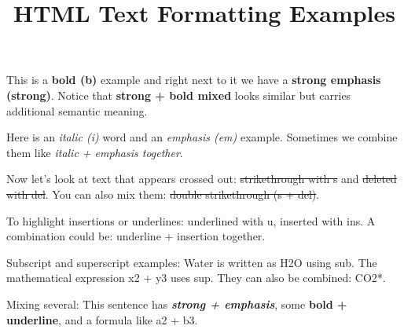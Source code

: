 \documentclass[11pt,a4paper]{article}
\title{HTML Text Formatting Examples}
\begin{document}
\maketitle

This is a \textbf{bold (b)} example and right next to it we have a \textbf{strong emphasis (strong)}. Notice that \textbf{strong + bold mixed} looks similar but carries additional semantic meaning.

Here is an \textit{italic (i)} word and an \textit{emphasis (em)} example. Sometimes we combine them like \textit{italic + emphasis together}.

Now let's look at text that appears crossed out: \sout{strikethrough with s} and \sout{deleted with del}. You can also mix them: \sout{double strikethrough (s + del)}.

To highlight insertions or underlines: underlined with u, inserted with ins. A combination could be: underline + insertion together.

Subscript and superscript examples: Water is written as H2O using sub. The mathematical expression x2 + y3 uses sup. They can also be combined: CO2*.

Mixing several: This sentence has \textit{\textbf{strong + emphasis}}, some \textbf{bold + underline}, and a formula like a2 + b3.
\end{document}
